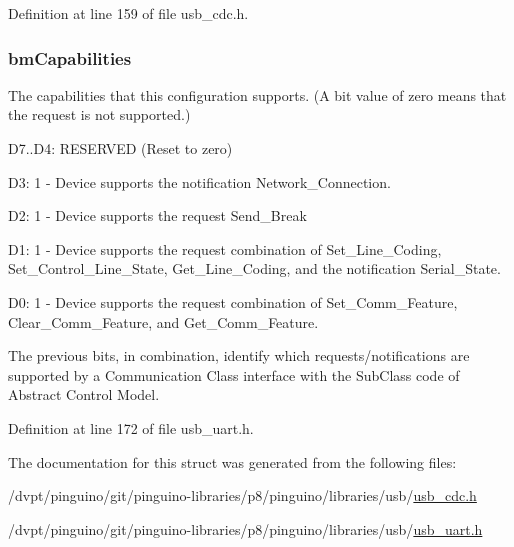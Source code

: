 Definition at line 159 of file usb\-\_\-cdc.\-h.

\hypertarget{struct_u_s_b___abstract___control___management___functional___descriptor_af402fe1fda6ed7e80071146e003be43e}{
\subsubsection[{bm\-Capabilities}]{ bm\-Capabilities}}\label{struct_u_s_b___abstract___control___management___functional___descriptor_af402fe1fda6ed7e80071146e003be43e}
The capabilities that this configuration supports. (A bit value of zero means that the request is not supported.)
\begin{DoxyItemize}
\item D7..D4\-: R\-E\-S\-E\-R\-V\-E\-D (Reset to zero)
\item D3\-: 1 -\/ Device supports the notification Network\-\_\-\-Connection.
\item D2\-: 1 -\/ Device supports the request Send\-\_\-\-Break
\item D1\-: 1 -\/ Device supports the request combination of Set\-\_\-\-Line\-\_\-\-Coding, Set\-\_\-\-Control\-\_\-\-Line\-\_\-\-State, Get\-\_\-\-Line\-\_\-\-Coding, and the notification Serial\-\_\-\-State.
\item D0\-: 1 -\/ Device supports the request combination of Set\-\_\-\-Comm\-\_\-\-Feature, Clear\-\_\-\-Comm\-\_\-\-Feature, and Get\-\_\-\-Comm\-\_\-\-Feature.
\end{DoxyItemize}The previous bits, in combination, identify which requests/notifications are supported by a Communication Class interface with the Sub\-Class code of Abstract Control Model. 

Definition at line 172 of file usb\-\_\-uart.\-h.



The documentation for this struct was generated from the following files\-:\begin{DoxyCompactItemize}
\item 
/dvpt/pinguino/git/pinguino-\/libraries/p8/pinguino/libraries/usb/\hyperlink{usb__cdc_8h}{usb\-\_\-cdc.\-h}\item 
/dvpt/pinguino/git/pinguino-\/libraries/p8/pinguino/libraries/usb/\hyperlink{usb__uart_8h}{usb\-\_\-uart.\-h}\end{DoxyCompactItemize}
